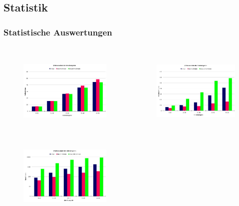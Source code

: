 \documentclass[professionalfont,serif,german]{beamer}
\begin{document}
\begin{frame}
  \section[Statistik]{Statistik}
  \frametitle{Statistische Auswertungen}
  \begin{columns}
    \begin{column}[T]{0.5\textwidth}
      \begin{figure}
        \includegraphics[height=4cm]{../thesis/images/statistik_1.JPG}
      \end{figure}
      \begin{figure}
        \includegraphics[height=4cm]{../thesis/images/statistik_2.JPG}
      \end{figure}
    \end{column}
    \begin{column}[T]{0.5\textwidth}
      \begin{figure}
        \includegraphics[height=4cm]{../thesis/images/statistik_3.JPG}
      \end{figure}
    \end{column}
  \end{columns}
\end{frame}
\end{document}
